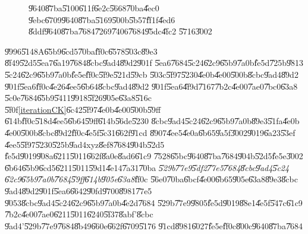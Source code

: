 \begin{figure}[th]
\caption{\U{9640}\U{87ba}\U{5100}\U{611f}\U{6e2c}\U{5668}\U{70ba}\U{4ec0}%
\U{9ebc}\U{6709}\U{9640}\U{87ba}\U{5169}\U{500b}\U{5b57}\U{ff1f}\U{4ed6}%
\U{8ddf}\U{9640}\U{87ba}\U{7684}\U{7269}\U{7406}\U{7684}\U{95dc}\U{4fc2}%
\U{5716}\U{3002}}
\begin{center}

\end{center}
\label{gyro_relation_graph}
\end{figure}

\bigskip

\U{9996}\U{5148}A\U{65b9}\U{6cd5}\U{70ba}\U{ff0c}\U{6578}\U{503c}\U{89e3}%
\U{8f49}\U{52d5}\U{5ea7}\U{6a19}\U{7684}\U{8cbc}\U{9ad4}\U{89d2}\U{901f}%
\U{5ea6}\U{7684}\U{5c24}\U{62c9}\U{65b9}\U{7a0b}\U{fe5d}\U{725b}\U{9813}%
\U{5c24}\U{62c9}\U{65b9}\U{7a0b}\U{fe5e}\U{ff0c}\U{5f9e}\U{521d}\U{59cb}%
\U{503c}\U{5f97}\U{5230}\U{4e0b}\U{4e00}\U{500b}\U{8cbc}\U{9ad4}\U{89d2}%
\U{901f}\U{5ea6}\U{ff0c}\U{4e26}\U{4ee5}\U{6b64}\U{8cbc}\U{9ad4}\U{89d2}%
\U{901f}\U{5ea6}\U{4f9d}\U{7167}\U{7b2c}\U{4e00}\U{7ae0}\U{7bc0}\U{63a8}%
\U{5c0e}\U{7684}\U{65b9}\U{5411}\U{9918}\U{5f26}\U{905e}\U{63a8}\U{516c}%
\U{5f0f}\ref{iterationCK}\U{6c42}\U{5f97}\U{4e0b}\U{4e00}\U{500b}\U{59ff}%
\U{614b}\U{ff0c}\U{518d}\U{4ee5}\U{6b64}\U{59ff}\U{614b}\U{56de}\U{5230}%
\U{8cbc}\U{9ad4}\U{5c24}\U{62c9}\U{65b9}\U{7a0b}\U{89e3}\U{51fa}\U{4e0b}%
\U{4e00}\U{500b}\U{8cbc}\U{89d2}\U{ff0c}\U{4e5f}\U{5c31}\U{662f}\U{91cd}%
\U{8907}\U{4ee5}\U{4e0a}\U{6b65}\U{9a5f}\U{3002}\U{9019}\U{6a23}\U{53ef}%
\U{4ee5}\U{5f97}\U{5230}\U{525b}\U{9ad4}xyz\U{8ef8}\U{7684}\U{904b}\U{52d5}%
\U{fe5d}\U{9019}\U{908a}\U{6211}\U{5011}\U{662f}\U{8a0e}\U{8ad6}\U{61c9}%
\U{7528}\U{65bc}\U{9640}\U{87ba}\U{7684}\U{904b}\U{52d5}\U{fe5e}\U{3002}%
\U{6b64}\U{65b9}\U{6cd5}\U{6211}\U{5011}\U{59d1}\U{4e14}\U{7a31}\U{70ba}%
\emph{\U{529b}\U{77e9}\U{5df2}\U{77e5}\U{7684}\U{8cbc}\U{9ad4}\U{5c24}%
\U{62c9}\U{65b9}\U{7a0b}\U{7684}\U{59ff}\U{614b}\U{905e}\U{63a8}}\U{ff0c}%
\U{56e0}\U{70ba}\U{6bcf}\U{4e00}\U{6b65}\U{905e}\U{63a8}\U{89e3}\U{8cbc}%
\U{9ad4}\U{89d2}\U{901f}\U{5ea6}\U{6642}\U{90fd}\U{9700}\U{8981}\U{77e5}%
\U{9053}\U{8cbc}\U{9ad4}\U{5c24}\U{62c9}\U{65b9}\U{7a0b}\U{4e2d}\U{7684}%
\U{529b}\U{77e9}\U{9805}\U{fe5d}\U{9019}\U{88e1}\U{4e5f}\U{547c}\U{61c9}%
\U{7b2c}\U{4e00}\U{7ae0}\U{6211}\U{5011}\U{6240}\U{5f37}\U{8abf}'\U{8cbc}%
\U{9ad4}'\U{529b}\U{77e9}\U{7684}\U{8b49}\U{660e}\U{662f}\U{6709}\U{5176}%
\U{91cd}\U{8981}\U{6027}\U{fe5e}\U{ff0c}\U{800c}\U{9640}\U{87ba}\U{7684}%
